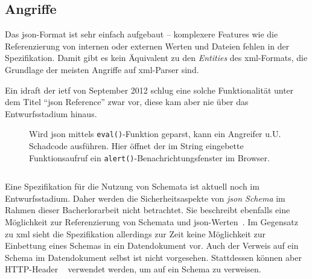 \subsection{Angriffe}

Das \acrshort{json}-Format ist sehr einfach aufgebaut -- komplexere Features wie die Referenzierung von internen oder externen Werten und Dateien fehlen in der Spezifikation. Damit gibt es kein Äquivalent zu den \emph{Entities} des \acrshort{xml}-Formats, die Grundlage der meisten Angriffe auf \acrshort{xml}-Parser sind.

Ein \acrfull{idraft} der \gls{ietf} von September 2012 schlug eine solche Funktionalität unter dem Titel \enquote{\acrshort{json} Reference} zwar vor, diese kam aber nie über das Entwurfsstadium hinaus.~\cite{jsonref}

\begin{figure}[bp!]
\begin{example} Wird \acrshort{json} mittels \texttt{eval()}-Funktion geparst, kann ein Angreifer u.U. Schadcode ausführen. Hier öffnet der im String eingebette Funktionsaufruf ein \texttt{alert()}-Benachrichtungsfenster im Browser.
\inputminted{javascript}{json-eval.js}
\begin{center}
\end{center}
\end{example}
\end{figure}

Eine Spezifikation für die Nutzung von Schemata ist aktuell noch im Entwurfsstadium. Daher werden die Sicherheitsaspekte von \emph{\acrshort{json} Schema} im Rahmen dieser Bacherlorarbeit nicht betrachtet. Sie beschreibt ebenfalls eine Möglichkeit zur Referenzierung von Schemata und \acrshort{json}-Werten~\cite[Abschnitt 8]{jsonschema}. Im Gegensatz zu \acrshort{xml} sieht die Spezifikation allerdings zur Zeit keine Möglichkeit zur Einbettung eines Schemas in ein Datendokument vor. Auch der Verweis auf ein Schema im Datendokument selbst ist nicht vorgesehen. Stattdessen können aber HTTP-Header ~\cite[Abschnitt 10.1]{jsonschema} verwendet werden, um auf ein Schema zu verweisen.

